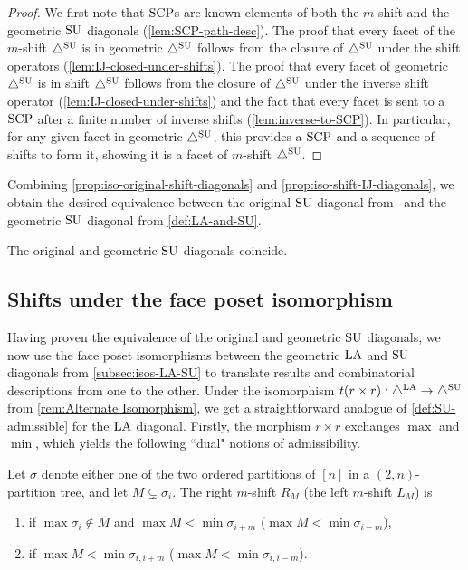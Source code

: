 \begin{proof}
We first note that $\mathrm{SCP}$s are known elements of both the $m$-shift and the geometric $\mathrm{SU}$ diagonals (\cref{lem:SCP-path-desc}).
The proof that every facet of the $m$-shift $\triangle^{\mathrm{SU}}$ is in geometric $\triangle^{\mathrm{SU}}$ follows from the closure of $\triangle^{\mathrm{SU}}$ under the shift operators (\cref{lem:IJ-closed-under-shifts}).
The proof that every facet of geometric $\triangle^{\mathrm{SU}}$ is in shift $\triangle^{\mathrm{SU}}$ follows from the closure of $\triangle^{\mathrm{SU}}$ under the inverse shift operator (\cref{lem:IJ-closed-under-shifts}) and the fact that every facet is sent to a $\mathrm{SCP}$ after a finite number of inverse shifts (\cref{lem:inverse-to-SCP}).
In particular, for any given facet in geometric $\triangle^{\mathrm{SU}}$, this provides a $\mathrm{SCP}$ and a sequence of shifts to form it, showing it is a facet of $m$-shift $\triangle^{\mathrm{SU}}$.
\end{proof}

Combining \cref{prop:iso-original-shift-diagonals} and \cref{prop:iso-shift-IJ-diagonals}, we obtain the desired equivalence between the original $\mathrm{SU}$ diagonal from~\cite{SaneblidzeUmble} and the geometric $\mathrm{SU}$ diagonal from \cref{def:LA-and-SU}.

\begin{theorem}
\label{thm:recover-SU}
The original and geometric $\mathrm{SU}$ diagonals coincide.
\end{theorem}


\subsection{Shifts under the face poset isomorphism}
\label{subsec:shifts-under-iso}

Having proven the equivalence of the original and geometric $\mathrm{SU}$ diagonals, we now use the face poset isomorphisms between the geometric $\mathrm{LA}$ and $\mathrm{SU}$ diagonals from \cref{subsec:isos-LA-SU} to translate results and combinatorial descriptions from one to the other. 
Under the isomorphism $t(r\times r):\triangle^{\mathrm{LA}}\to\triangle^{\mathrm{SU}}$ from \cref{rem:Alternate Isomorphism}, we get a straightforward analogue of \cref{def:SU-admissible} for the $\mathrm{LA}$ diagonal.
Firstly, the morphism $r \times r$ exchanges $\max$ and $\min$, which yields the following ``dual" notions of admissibility.

\begin{definition}
\label{def:LA-admissible}
Let $\sigma$ denote either one of the two ordered partitions of $[n]$ in a $(2,n)$-partition tree, and let $M \subsetneq \sigma_i$.
The right $m$-shift $R_{M}$ (\resp the left $m$-shift $L_{M}$) is 
\begin{enumerate}
\item {} if $\max \sigma_i \notin M$ and $\max M < \min \sigma_{i+m}$ (\resp $\max M < \min \sigma_{i-m}$),
\item {} if $\max M< \min \sigma_{i,i+m}$ (\resp $\max M < \min \sigma_{i,i-m}$).
\end{enumerate}
\end{definition}

